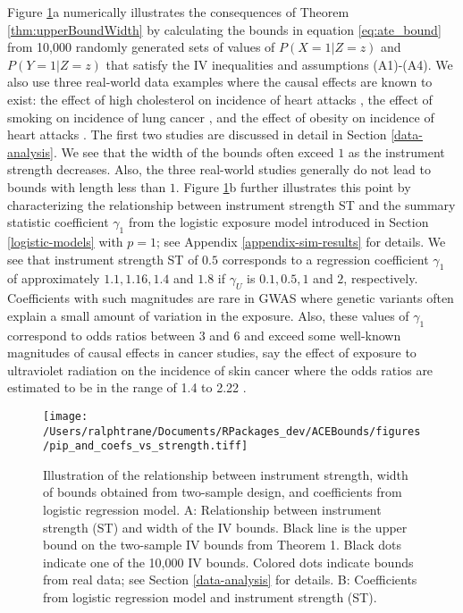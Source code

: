 \documentclass[AMA,STIX1COL,]{WileyNJD-v2}
\begin{document}
Figure \ref{fig:biv_bounds_vs_strength}a numerically illustrates the
consequences of Theorem \ref{thm:upperBoundWidth} by calculating the
bounds in equation \eqref{eq:ate_bound} from 10,000 randomly generated
sets of values of \(P(X = 1 | Z = z)\) and \(P(Y = 1 | Z = z)\) that
satisfy the IV inequalities and assumptions (A1)-(A4). We also use three
real-world data examples where the causal effects are known to exist:
the effect of high cholesterol on incidence of heart attacks
\citep{cholesterol_treatment_trialists_ctt_collaborators_effects_2012},
the effect of smoking on incidence of lung cancer
\citep{cornfield_smoking_1959}, and the effect of obesity on incidence
of heart attacks \citep{yusuf_obesity_2005}. The first two studies are
discussed in detail in Section \ref{data-analysis}. We see that the
width of the bounds often exceed \(1\) as the instrument strength
decreases. Also, the three real-world studies generally do not lead to
bounds with length less than \(1\). Figure
\ref{fig:biv_bounds_vs_strength}b further illustrates this point by
characterizing the relationship between instrument strength ST and the
summary statistic coefficient \(\gamma_1\) from the logistic exposure
model introduced in Section \ref{logistic-models} with \(p=1\); see
Appendix \ref{appendix-sim-results} for details. We see that instrument
strength ST of \(0.5\) corresponds to a regression coefficient
\(\gamma_1\) of approximately \(1.1, 1.16, 1.4\) and \(1.8\) if
\(\gamma_U\) is \(0.1, 0.5, 1\) and \(2\), respectively. Coefficients
with such magnitudes are rare in GWAS where genetic variants often
explain a small amount of variation in the exposure. Also, these values
of \(\gamma_1\) correspond to odds ratios between \(3\) and \(6\) and
exceed some well-known magnitudes of causal effects in cancer studies,
say the effect of exposure to ultraviolet radiation on the incidence of
skin cancer where the odds ratios are estimated to be in the range of
1.4 to 2.22 \citep{schmitt_occupational_2011}.

\begin{figure}[ht]
  \centering
  \texttt{[image: /Users/ralphtrane/Documents/RPackages\_dev/ACEBounds/figures/pip\_and\_coefs\_vs\_strength.tiff]}
  \caption{Illustration of the relationship between instrument strength, width of bounds obtained from two-sample design, and coefficients from logistic regression model. A: Relationship between instrument strength (ST) and width of the IV bounds. Black line is the upper bound on the two-sample IV bounds from Theorem 1. Black dots indicate one of the 10,000 IV bounds. Colored dots indicate bounds from real data; see Section \ref{data-analysis} for details. B: Coefficients from logistic regression model and instrument strength (ST).}
  \label{fig:biv_bounds_vs_strength}
\end{figure}
\end{document}
